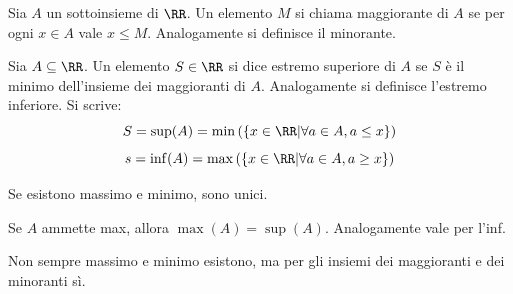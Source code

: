 \documentclass[11pt]{scrartcl}
\begin{document}
	\begin{definition}
		Sia $A$ un sottoinsieme di $\RR$. Un elemento $M$ si chiama maggiorante di $A$ se per ogni $x\in A$ vale $x\le M$. Analogamente si definisce il minorante.
	\end{definition}
	
	\begin{definition}
		Sia $A\subseteq\RR$. Un elemento $S\in\RR$ si dice estremo superiore di $A$ se $S$ è il minimo dell'insieme dei maggioranti di $A$. Analogamente si definisce l'estremo inferiore. Si scrive:
		$$S=\sup(A)=\min\left(\left\{x\in \RR | \forall a\in A,a\le x\right\}\right)$$
		$$s=\inf(A)=\max\left(\left\{x\in \RR | \forall a\in A,a\ge x\right\}\right)$$
	\end{definition}
	
	\begin{remark}
		Se esistono massimo e minimo, sono unici.
	\end{remark}
	\begin{remark}
		Se $A$ ammette max, allora $\max(A)=\sup(A)$. Analogamente vale per l'inf.
	\end{remark}
	
	Non sempre massimo e minimo esistono, ma per gli insiemi dei maggioranti e dei minoranti sì.
	
\end{document}
